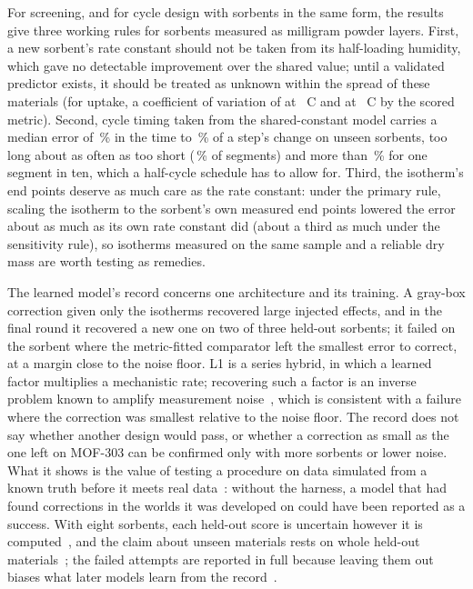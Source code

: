 \documentclass[12pt]{article}
\begin{document}
For screening, and for cycle design with sorbents in the same form, the results give three working rules for
sorbents measured as milligram powder layers. First, a new sorbent's rate constant should not be taken from its
half-loading humidity, which gave no detectable improvement over the shared value; until a validated predictor exists, it should be treated as unknown within the spread of these materials (for uptake, a coefficient of variation of
 at ~\textdegree C and  at ~\textdegree C by the scored
metric). Second, cycle timing taken
from the shared-constant model carries a median error of \,\% in the time to \,\% of a
step's change on unseen sorbents, too long about as often as too short (\,\% of segments) and more
than \,\% for one segment in ten, which a half-cycle schedule has to allow for. Third, the isotherm's end points
deserve as much care as the rate constant: under the primary rule, scaling the isotherm to the sorbent's own measured
end points lowered the error about as much as its own rate constant did (about a third as much under the sensitivity
rule), so isotherms measured on the same sample and a reliable dry mass are worth testing as remedies.

The learned model's record concerns one architecture and its training. A gray-box correction given only the isotherms
recovered large injected effects, and in the final round it recovered a new one on two of three held-out sorbents; it
failed on the sorbent where the metric-fitted comparator left the smallest error to correct, at a margin close to the
noise floor. L1 is a series hybrid, in which a learned factor multiplies a mechanistic rate; recovering such a
factor is an inverse problem known to amplify measurement noise~\cite{Cho2026Dictionary}, which is consistent with a
failure where the correction was smallest relative to the noise floor. The record does not say whether another
design would pass, or whether a correction as small as the one
left on MOF-303 can be confirmed only with more sorbents or lower noise. What it shows is the value of testing a procedure on data
simulated from a known truth before it meets real data~\cite{Cook2006Validation,Talts2018Validating,Modrak2025Simulation}: without the
harness, a model that had found corrections in the worlds it was developed on could have been reported as a success.
With eight sorbents, each held-out score is uncertain however it is computed~\cite{Varoquaux2018Cross}, and the claim
about unseen materials rests on whole held-out materials~\cite{Meredig2018Can}; the failed attempts are reported in
full because leaving them out biases what later models learn from the record~\cite{StriethKalthoff2022Machine}.
\end{document}
